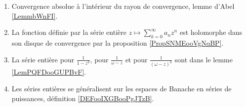 \begin{description}
\begin{enumerate}
		      \item
		            Convergence absolue à l'intérieur du rayon de convergence, lemme d'Abel \ref{LemmbWnFI}.
		      \item
		            La fonction définie par la série entière  \(z\mapsto \sum_{k=0}^{\infty}a_nz^n\) est holomorphe dans son disque de convergence par la proposition \ref{PropSNMEooVgNqBP}.
		      \item
		            La série entière pour \( \frac{1}{ 1-z^k }\), pour \( \frac{1}{ \omega-z }\) et pour \( \frac{1}{ (\omega-z)^k }\) sont dans le lemme \ref{LemPQFDooGUPBvF}.
		      \item
		            Les séries entières se généralisent sur les espaces de Banache en séries de puissances, définition \ref{DEFooIXGBooPgJTzB}.
	      \end{enumerate}
\end{description}
